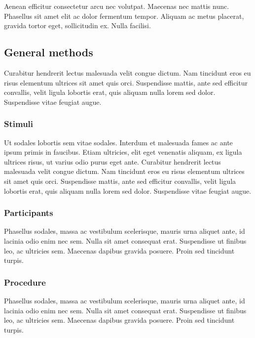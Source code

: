 \documentclass[12pt,oneside]{article}
\begin{document}
Aenean efficitur consectetur arcu nec volutpat. Maecenas nec mattis
nunc. Phasellus sit amet elit ac dolor fermentum tempor. Aliquam ac
metus placerat, gravida tortor eget, sollicitudin ex. Nulla facilisi.

\subsection{General methods}\label{general-methods}

Curabitur hendrerit lectus malesuada velit congue dictum. Nam tincidunt
eros eu risus elementum ultrices sit amet quis orci. Suspendisse mattis,
ante sed efficitur convallis, velit ligula lobortis erat, quis aliquam
nulla lorem sed dolor. Suspendisse vitae feugiat augue.

\subsubsection{Stimuli}\label{stimuli}

Ut sodales lobortis sem vitae sodales. Interdum et malesuada fames ac
ante ipsum primis in faucibus. Etiam ultricies, elit eget venenatis
aliquam, ex ligula ultrices risus, ut varius odio purus eget ante.
Curabitur hendrerit lectus malesuada velit congue dictum. Nam tincidunt
eros eu risus elementum ultrices sit amet quis orci. Suspendisse mattis,
ante sed efficitur convallis, velit ligula lobortis erat, quis aliquam
nulla lorem sed dolor. Suspendisse vitae feugiat augue.

\subsubsection{Participants}\label{participants}

Phasellus sodales, massa ac vestibulum scelerisque, mauris urna aliquet
ante, id lacinia odio enim nec sem. Nulla sit amet consequat erat.
Suspendisse ut finibus leo, ac ultricies sem. Maecenas dapibus gravida
posuere. Proin sed tincidunt turpis.

\subsubsection{Procedure}\label{procedure}

Phasellus sodales, massa ac vestibulum scelerisque, mauris urna aliquet
ante, id lacinia odio enim nec sem. Nulla sit amet consequat erat.
Suspendisse ut finibus leo, ac ultricies sem. Maecenas dapibus gravida
posuere. Proin sed tincidunt turpis.
\end{document}
